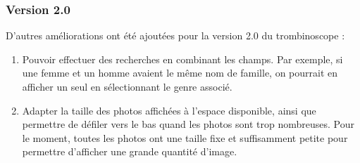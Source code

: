 \documentclass[french]{article}
\begin{document}
\subsubsection{Version 2.0}

\noindent D'autres améliorations ont été ajoutées pour la version 2.0 du trombinoscope :
\begin{enumerate}
    \item Pouvoir effectuer des recherches en combinant les champs. Par exemple, si une femme et un homme avaient le même nom de famille, on pourrait en afficher un seul en sélectionnant le genre associé.
    \item Adapter la taille des photos affichées à l'espace disponible, ainsi que permettre de défiler vers le bas quand les photos sont trop nombreuses. Pour le moment, toutes les photos ont une taille fixe et suffisamment petite pour permettre d'afficher une grande quantité d'image.
\end{enumerate}
\end{document}
